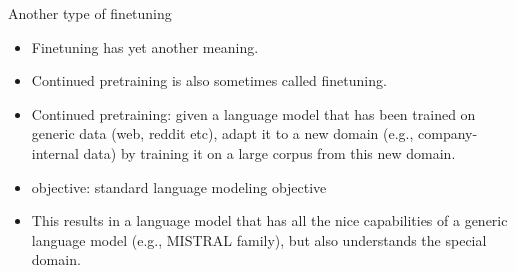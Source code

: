 
\begin{frame}{Another type of finetuning}

\vfill

\begin{itemize}
    \item Finetuning has yet another meaning.
    \item Continued pretraining is also sometimes called
    finetuning.
    \item Continued pretraining: given a language model
that has been    trained on generic data (web, reddit etc),
    adapt it to a new domain (e.g., company-internal data) by
    training it on a large corpus from this new domain.
\item objective: standard language modeling objective
    \item This results in a language model that has all the
    nice capabilities of a generic language model (e.g.,
    MISTRAL family), but also understands the special domain.
\end{itemize}

\vfill

\end{frame}




%
%	
%
%


%
%
%
%

